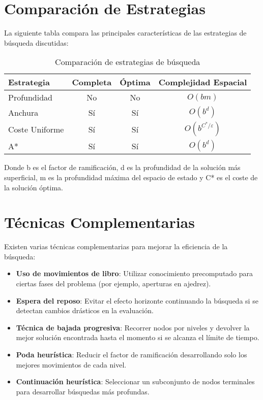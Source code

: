 \documentclass[12pt,a4paper]{report}
\begin{document}
	\section{Comparación de Estrategias}
	
	La siguiente tabla compara las principales características de las estrategias de búsqueda discutidas:
	
	\begin{table}[h]
		\centering
		\begin{tabular}{|l|c|c|c|}
			\hline
			\textbf{Estrategia} & \textbf{Completa} & \textbf{Óptima} & \textbf{Complejidad Espacial} \\
			\hline
			Profundidad & No & No & $O(bm)$ \\
			Anchura & Sí & Sí & $O(b^d)$ \\
			Coste Uniforme & Sí & Sí & $O(b^{C^*/\varepsilon})$ \\
			A* & Sí & Sí & $O(b^d)$ \\
			\hline
		\end{tabular}
		\caption{Comparación de estrategias de búsqueda}
		\label{tab:comparison}
	\end{table}
	
	Donde b es el factor de ramificación, d es la profundidad de la solución más superficial, m es la profundidad máxima del espacio de estado y C* es el coste de la solución óptima.
	
	\section{Técnicas Complementarias}
	
	Existen varias técnicas complementarias para mejorar la eficiencia de la búsqueda:
	
	\begin{itemize}
		\item \textbf{Uso de movimientos de libro}: Utilizar conocimiento precomputado para ciertas fases del problema (por ejemplo, aperturas en ajedrez).
		\item \textbf{Espera del reposo}: Evitar el efecto horizonte continuando la búsqueda si se detectan cambios drásticos en la evaluación.
		\item \textbf{Técnica de bajada progresiva}: Recorrer nodos por niveles y devolver la mejor solución encontrada hasta el momento si se alcanza el límite de tiempo.
		\item \textbf{Poda heurística}: Reducir el factor de ramificación desarrollando solo los mejores movimientos de cada nivel.
		\item \textbf{Continuación heurística}: Seleccionar un subconjunto de nodos terminales para desarrollar búsquedas más profundas.
	\end{itemize}
	
\end{document}
